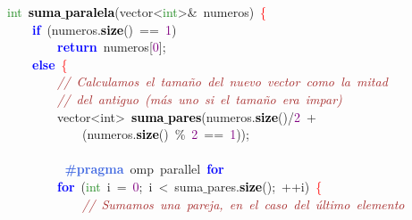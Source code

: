 \noindent
\mbox{}\textcolor{ForestGreen}{int}\ \textbf{\textcolor{Black}{suma$\_$paralela}}\textcolor{BrickRed}{(}vector\textcolor{BrickRed}{\textless{}}\textcolor{ForestGreen}{int}\textcolor{BrickRed}{\textgreater{}\&}\ numeros\textcolor{BrickRed}{)}\ \textcolor{Red}{\{} \\
\mbox{}\ \ \ \ \textbf{\textcolor{Blue}{if}}\ \textcolor{BrickRed}{(}numeros\textcolor{BrickRed}{.}\textbf{\textcolor{Black}{size}}\textcolor{BrickRed}{()}\ \textcolor{BrickRed}{==}\ \textcolor{Purple}{1}\textcolor{BrickRed}{)} \\
\mbox{}\ \ \ \ \ \ \ \ \textbf{\textcolor{Blue}{return}}\ numeros\textcolor{BrickRed}{[}\textcolor{Purple}{0}\textcolor{BrickRed}{];} \\
\mbox{}\ \ \ \ \textbf{\textcolor{Blue}{else}}\ \textcolor{Red}{\{} \\
\mbox{}\ \ \ \ \ \ \ \ \textit{\textcolor{Brown}{//\ Calculamos\ el\ tamaño\ del\ nuevo\ vector\ como\ la\ mitad}} \\
\mbox{}\ \ \ \ \ \ \ \ \textit{\textcolor{Brown}{//\ del\ antiguo\ (más\ uno\ si\ el\ tamaño\ era\ impar)}} \\
\mbox{}\ \ \ \ \ \ \ \ \textcolor{TealBlue}{vector\textless{}int\textgreater{}}\ \textbf{\textcolor{Black}{suma$\_$pares}}\textcolor{BrickRed}{(}numeros\textcolor{BrickRed}{.}\textbf{\textcolor{Black}{size}}\textcolor{BrickRed}{()/}\textcolor{Purple}{2}\ \textcolor{BrickRed}{+}\  \\
\mbox{}\ \ \ \ \ \ \ \ \ \ \ \ \textcolor{BrickRed}{(}numeros\textcolor{BrickRed}{.}\textbf{\textcolor{Black}{size}}\textcolor{BrickRed}{()}\ \textcolor{BrickRed}{\%}\ \textcolor{Purple}{2}\ \textcolor{BrickRed}{==}\ \textcolor{Purple}{1}\textcolor{BrickRed}{));} \\
\mbox{} \\
\mbox{}\textbf{\textcolor{RoyalBlue}{\ \ \ \ \ \ \ \ \#pragma}}\ omp\ parallel\ \textbf{\textcolor{Blue}{for}} \\
\mbox{}\ \ \ \ \ \ \ \ \textbf{\textcolor{Blue}{for}}\ \textcolor{BrickRed}{(}\textcolor{ForestGreen}{int}\ i\ \textcolor{BrickRed}{=}\ \textcolor{Purple}{0}\textcolor{BrickRed}{;}\ i\ \textcolor{BrickRed}{\textless{}}\ suma$\_$pares\textcolor{BrickRed}{.}\textbf{\textcolor{Black}{size}}\textcolor{BrickRed}{();}\ \textcolor{BrickRed}{++}i\textcolor{BrickRed}{)}\ \textcolor{Red}{\{} \\
\mbox{}\ \ \ \ \ \ \ \ \ \ \ \ \textit{\textcolor{Brown}{//\ Sumamos\ una\ pareja,\ en\ el\ caso\ del\ último\ elemento\ }} \\
